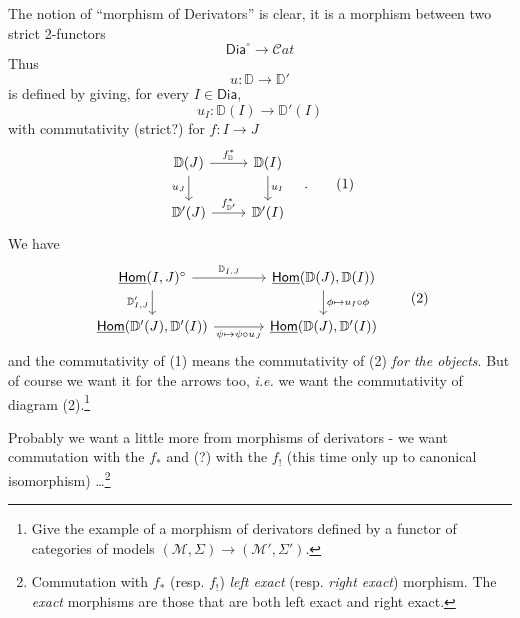 \documentclass[11pt]{article}
\newcommand{\msp}[1]{\marginpar{\footnotesize [#1]}}
\newcommand{\DD}{\mathbb{D}}
\newcommand{\uHom}{\underline{\mathsf{Hom}}}
\newcommand{\Dia}{\mathsf{Dia}}
\begin{document}
\noindent\msp{page 14}The notion of ``morphism of Derivators'' is clear, it is a morphism between two strict 2-functors
\[
\Dia^\circ \longrightarrow \mathcal{C}at
\]
Thus
\[
u : \DD \longrightarrow \DD'
\]
is defined by giving, for every $I \in \Dia$,
\[
u_I : \DD(I) \longrightarrow \DD'(I)
\]
with commutativity (strict?) for $f : I \to J$
\[
\begin{tikzcd}
\DD(J) \arrow[r, "f^*_{\DD}"] \arrow[d, "u_J"'] & \DD(I) \arrow[d, "u_I"] \\
\DD'(J) \arrow[r, "f^*_{\DD'}"] & \DD'(I)
\end{tikzcd}
\quad . \tag*{(1)}
\]
We have
\[
\begin{tikzcd}[column sep=large]
\uHom(I,J)^\circ \arrow[r, "\DD_{I,J}"] \arrow[d, "\DD'_{I,J}"'] & \uHom(\DD(J),\DD(I)) \arrow[d, "\phi \mapsto u_I \circ \phi"] \\
\uHom(\DD'(J),\DD'(I)) \arrow[r, "\psi \mapsto \psi \circ u_J"'] & \uHom(\DD(J),\DD'(I))
\end{tikzcd}
\tag*{(2)}
\]
and the commutativity of (1) means the commutativity of (2) \textit{for the objects}. But of course we want it for the arrows too, \textit{i.e.} we want the commutativity of diagram (2).\footnote[5]{Give the example of a morphism of derivators defined by a functor of categories of models $(\mathcal{M},\Sigma) \to (\mathcal{M}',\Sigma')$.}

Probably we want a little more from morphisms of derivators - we want commutation with the $f_*$ and (?) with the $f_!$ (this time only up to canonical isomorphism) \ldots\footnote[6]{Commutation with $f_*$ (resp. $f_!$) \textit{left exact} (resp. \textit{right exact}) morphism. The \textit{exact} morphisms are those that are both left exact and right exact.}
\end{document}
